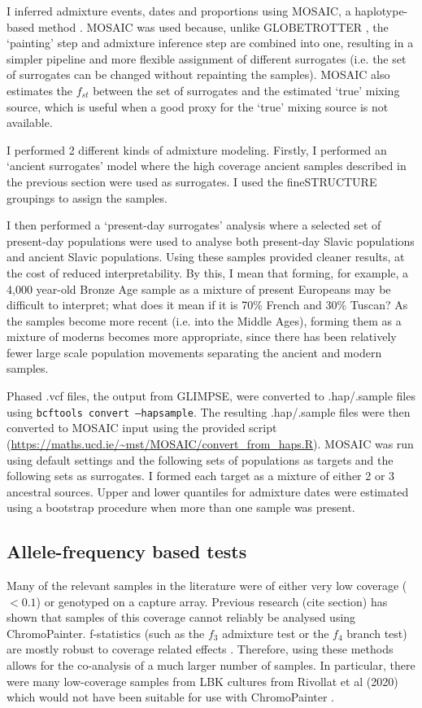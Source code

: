 I inferred admixture events, dates and proportions using MOSAIC, a haplotype-based method \cite{MOSAIC_2019}. MOSAIC was used because, unlike GLOBETROTTER \cite{Hellenthal2014}, the `painting' step and admixture inference step are combined into one, resulting in a simpler pipeline and more flexible assignment of different surrogates (i.e. the set of surrogates can be changed without repainting the samples). MOSAIC also estimates the $f_{st}$ between the set of surrogates and the estimated `true' mixing source, which is useful when a good proxy for the `true' mixing source is not available. 

I performed 2 different kinds of admixture modeling. Firstly, I performed an `ancient surrogates' model where the high coverage ancient samples described in the previous section were used as surrogates. I used the fineSTRUCTURE groupings to assign the samples.

I then performed a `present-day surrogates' analysis where a selected set of present-day populations were used to analyse both present-day Slavic populations and ancient Slavic populations. Using these samples provided cleaner results, at the cost of reduced interpretability. By this, I mean that forming, for example, a 4,000 year-old Bronze Age sample as a mixture of present Europeans may be difficult to interpret; what does it mean if it is 70\% French and 30\% Tuscan? As the samples become more recent (i.e. into the Middle Ages), forming them as a mixture of moderns becomes more appropriate, since there has been relatively fewer large scale population movements separating the ancient and modern samples.

Phased .vcf files, the output from GLIMPSE, were converted to .hap/.sample files using \texttt{bcftools convert --hapsample}. The resulting .hap/.sample files were then converted to MOSAIC input using the provided script (\url{https://maths.ucd.ie/~mst/MOSAIC/convert_from_haps.R}). MOSAIC was run using default settings and the following sets of populations as targets and the following sets as surrogates. I formed each target as a mixture of either 2 or 3 ancestral sources. Upper and lower quantiles for admixture dates were estimated using a bootstrap procedure when more than one sample was present. 

\subsection{Allele-frequency based tests}

Many of the relevant samples in the literature were of either very low coverage ($<0.1$) or genotyped on a capture array. Previous research (cite section) has shown that samples of this coverage cannot reliably be analysed using ChromoPainter. f-statistics (such as the $f_{3}$ admixture test or the $f_{4}$ branch test) are mostly robust to coverage related effects \cite{AssessingqpAdm}. Therefore, using these methods allows for the co-analysis of a much larger number of samples. In particular, there were many low-coverage samples from LBK cultures from Rivollat et al (2020) which would not have been suitable for use with ChromoPainter \cite{rivollat2020france}. 

